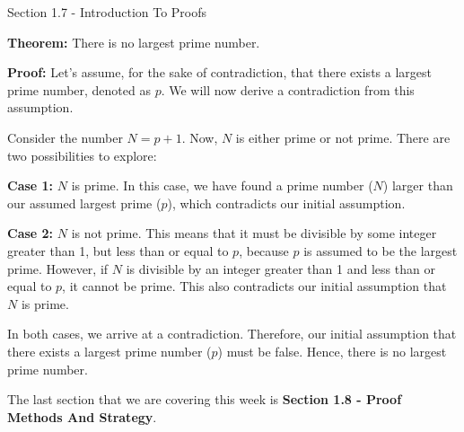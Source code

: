 \begin{notes}{Section 1.7 - Introduction To Proofs}
    \begin{Highlight}
        \textbf{Theorem:} There is no largest prime number. \vspace*{1em}
    
    
        \textbf{Proof:} Let's assume, for the sake of contradiction, that there exists a largest prime number, denoted as \(p\). We will now derive a contradiction from this assumption.
    
        Consider the number \(N = p + 1\). Now, \(N\) is either prime or not prime. There are two possibilities to explore:
    
        \textbf{Case 1:} \(N\) is prime. In this case, we have found a prime number (\(N\)) larger than our assumed largest prime (\(p\)), which contradicts our initial assumption.
    
        \textbf{Case 2:} \(N\) is not prime. This means that it must be divisible by some integer greater than 1, but less than or equal to \(p\), because \(p\) is assumed to be the largest prime. 
        However, if \(N\) is divisible by an integer greater than 1 and less than or equal to \(p\), it cannot be prime. This also contradicts our initial assumption that \(N\) is prime.
    
    
        In both cases, we arrive at a contradiction. Therefore, our initial assumption that there exists a largest prime number (\(p\)) must be false. Hence, there is no largest prime number.
    \end{Highlight}    
\end{notes}

The last section that we are covering this week is \textbf{Section 1.8 - Proof Methods And Strategy}.


